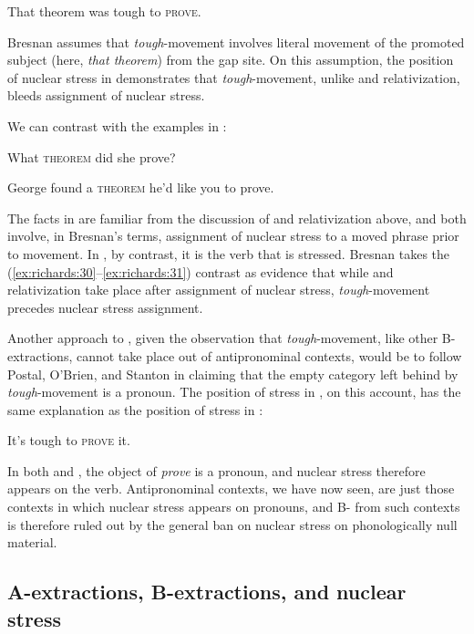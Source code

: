 \documentclass[output=paper]{LSP/langsci}
\begin{document}
\ea%
    \label{ex:richards:30}

  	  That theorem was tough to \textsc{prove}.
\z

Bresnan assumes that \textit{tough}{}-movement involves literal movement of the promoted subject (here, \textit{that theorem})\textit{} from the gap site.  On this assumption, the position of nuclear stress in  demonstrates that \textit{tough}{}-movement, unlike  and relativization, bleeds assignment of nuclear stress.  

  We can contrast  with the examples in :


\ea%
    \label{ex:richards:31}
  
\ea What \textsc{theorem} did she prove?

\ex George found a \textsc{theorem} he'd like you to prove.
\z
\z

The facts in  are familiar from the discussion of  and relativization above, and both involve, in Bresnan's terms, assignment of nuclear stress to a moved phrase prior to movement.  In , by contrast, it is the verb that is stressed.  Bresnan takes the (\ref{ex:richards:30}--\ref{ex:richards:31}) contrast as evidence that while  and relativization take place after assignment of nuclear stress, \textit{tough}{}-movement precedes nuclear stress assignment.

  Another approach to , given the observation that \textit{tough}{}-movement, like other B-extractions, cannot take place out of antipronominal contexts, would be to follow Postal, O’Brien, and Stanton in claiming that the empty category left behind by \textit{tough}{}-movement is a pronoun.  The position of stress in , on this account, has the same explanation as the position of stress in :


\ea%
    \label{ex:richards:32}
	  It's tough to \textsc{prove} it.
\z


In both  and , the object of \textit{prove} is a pronoun, and nuclear stress therefore appears on the verb.  Antipronominal contexts, we have now seen, are just those contexts in which nuclear stress appears on pronouns, and B- from such contexts is therefore ruled out by the general ban on nuclear stress on phonologically null material.  

\subsection{A-extractions, B-extractions, and nuclear stress  }
\end{document}
